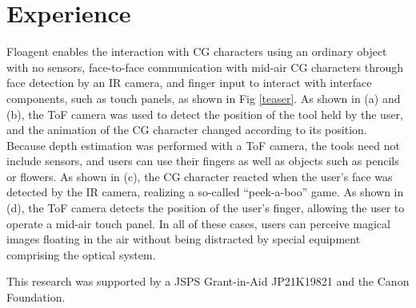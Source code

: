 \documentclass[sigconf]{acmart}
\begin{document}
\section{Experience \label{consideration}}

Floagent enables the interaction with CG characters using an ordinary object with no sensors, face-to-face communication with mid-air CG characters through face detection by an IR camera, and finger input to interact with interface components, such as touch panels, as shown in Fig \ref{teaser}.
As shown in (a) and (b), the ToF camera was used to detect the position of the tool held by the user, and the animation of the CG character changed according to its position.
Because depth estimation was performed with a ToF camera, the tools need not include sensors, and users can use their fingers as well as objects such as pencils or flowers.
As shown in (c), the CG character reacted when the user's face was detected by the IR camera, realizing a so-called ``peek-a-boo'' game.
As shown in (d), the ToF camera detects the position of the user's finger, allowing the user to operate a mid-air touch panel.
In all of these cases, users can perceive magical images floating in the air without being distracted by special equipment comprising the optical system.

\begin{acks}
  This research was supported by a JSPS Grant-in-Aid JP21K19821 and the Canon Foundation.
\end{acks}



\end{document}
